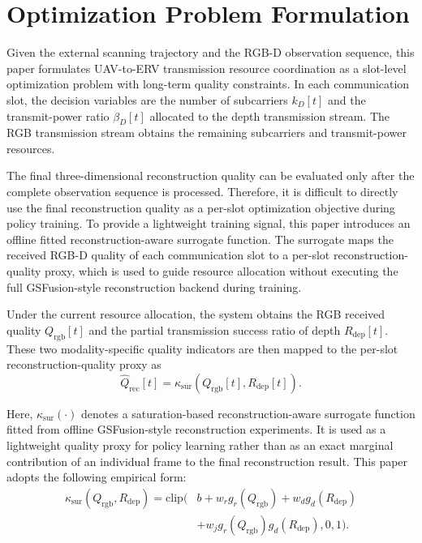 \documentclass[journal]{IEEEtran}
\begin{document}
\section{Optimization Problem Formulation}
\label{sec:problem_formulation}

Given the external scanning trajectory and the RGB-D observation sequence, this paper formulates UAV-to-ERV transmission resource coordination as a slot-level optimization problem with long-term quality constraints. In each communication slot, the decision variables are the number of subcarriers $k_D[t]$ and the transmit-power ratio $\beta_D[t]$ allocated to the depth transmission stream. The RGB transmission stream obtains the remaining subcarriers and transmit-power resources.

The final three-dimensional reconstruction quality can be evaluated only after the complete observation sequence is processed. Therefore, it is difficult to directly use the final reconstruction quality as a per-slot optimization objective during policy training. To provide a lightweight training signal, this paper introduces an offline fitted reconstruction-aware surrogate function. The surrogate maps the received RGB-D quality of each communication slot to a per-slot reconstruction-quality proxy, which is used to guide resource allocation without executing the full GSFusion-style reconstruction backend during training.

Under the current resource allocation, the system obtains the RGB received quality $Q_{\mathrm{rgb}}[t]$ and the partial transmission success ratio of depth $R_{\mathrm{dep}}[t]$. These two modality-specific quality indicators are then mapped to the per-slot reconstruction-quality proxy as
\begin{equation}
\hat{Q}_{\mathrm{rec}}[t]
=
\kappa_{\mathrm{sur}}
\left(
Q_{\mathrm{rgb}}[t],
R_{\mathrm{dep}}[t]
\right).
\end{equation}

Here, $\kappa_{\mathrm{sur}}(\cdot)$ denotes a saturation-based reconstruction-aware surrogate function fitted from offline GSFusion-style reconstruction experiments. It is used as a lightweight quality proxy for policy learning rather than as an exact marginal contribution of an individual frame to the final reconstruction result. This paper adopts the following empirical form:
\begin{equation}
\begin{aligned}
\kappa_{\mathrm{sur}}
\left(
Q_{\mathrm{rgb}},
R_{\mathrm{dep}}
\right)
=
\mathrm{clip}
\Big(
&
b
+
w_r g_r
\left(
Q_{\mathrm{rgb}}
\right)
+
w_d g_d
\left(
R_{\mathrm{dep}}
\right)
\\
&
+
w_j g_r
\left(
Q_{\mathrm{rgb}}
\right)
g_d
\left(
R_{\mathrm{dep}}
\right),
0,
1
\Big).
\end{aligned}
\end{equation}
\end{document}
